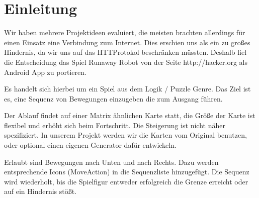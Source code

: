 \section{Einleitung}
Wir haben mehrere Projektideen evaluiert, die meisten brachten allerdings für
einen Einsatz eine Verbindung zum Internet. Dies erschien uns als ein zu großes
Hindernis, da wir uns auf das HTTProtokol beschränken müssten. Deshalb fiel die
Entscheidung das Spiel Runaway Robot von der Seite http://hacker.org als
Android App zu portieren.

Es handelt sich hierbei um ein Spiel aus dem Logik / Puzzle Genre.
Das Ziel ist es, eine Sequenz von Bewegungen einzugeben die zum Ausgang führen.

Der Ablauf findet auf einer Matrix ähnlichen Karte statt, die Größe der Karte
ist flexibel und erhöht sich beim Fortschritt. Die Steigerung ist nicht näher
spezifiziert. In unserem Projekt werden wir die Karten vom Original benutzen,
oder optional einen eigenen Generator dafür entwickeln.

Erlaubt sind Bewegungen nach Unten und nach Rechts. Dazu werden entsprechende
Icons (MoveAction) in die Sequenzliste hinzugefügt. Die Sequenz wird wiederholt, bis die
Spielfigur entweder erfolgreich die Grenze erreicht oder auf ein Hindernis stößt.

